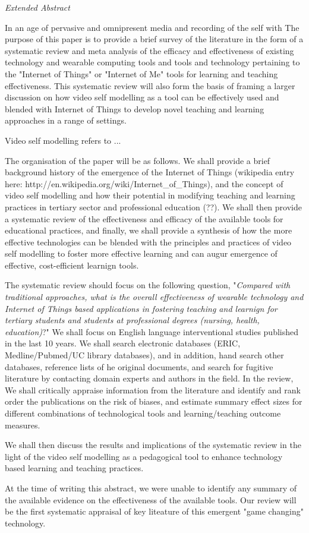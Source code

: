 \textit{Extended Abstract} 

In an age of pervasive and omnipresent media and recording of the self with The purpose of this paper is to provide a brief survey of the literature in the form of a systematic review and meta analysis of the efficacy and effectiveness of existing technology and wearable computing tools and tools and technology pertaining to the "Internet of Things" or "Internet of Me" tools for learning and teaching effectiveness. This systematic review will also form the basis of framing a larger discussion on how video self modelling as a tool can be effectively used and blended with Internet of Things to develop novel teaching and learning approaches in a range of settings. 

Video self modelling refers to ... 

The organisation of the paper will be as follows. We shall provide a brief background history of the emergence of the Internet of Things (wikipedia entry here: http://en.wikipedia.org/wiki/Internet_of_Things), and the concept of video self modelling and how their potential in modifying teaching and learning practices in tertiary sector and professional education (??). We shall then provide a systematic review of the effectiveness and efficacy of the available tools for educational practices, and finally, we shall provide a synthesis of how the more effective technologies can be blended with the principles and practices of video self modelling to foster more effective learning and can augur emergence of effective, cost-efficient learnign tools.

The systematic review should focus on the following question, "\textit{Compared with traditional approaches, what is the overall effectiveness of wearable technology and Internet of Things based applications in fostering teaching and learnign for tertiary students and students at professional degrees (nursing, health, education)}?" We shall focus on English language interventional studies published in the last 10 years. We shall search electronic databases (ERIC, Medline/Pubmed/UC library databases), and in addition,  hand search other databases, reference lists of he original documents, and search for fugitive literature by contacting domain experts and authors in the field. In the review, We shall critically appraise information from the literature and identify and rank order the publications on the risk of biases, and estimate summary effect sizes for different combinations of technological tools and learning/teaching outcome measures. 

We shall then discuss the results and implications of the systematic review in the light of the video self modelling as a pedagogical tool to enhance technology based learning and teaching practices. 

At the time of writing this abstract, we were unable to identify any summary of the available evidence on the effectiveness of the available tools. Our review will be the first systematic appraisal of key liteature of this emergent "game changing" technology. 